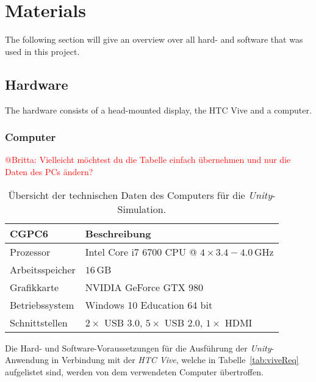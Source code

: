 \section{Materials}\label{sec:Materials}

The following section will give an overview over all hard- and software that was used in this project. 

\subsection{Hardware}\label{sec:Hardware}

The hardware consists of a head-mounted display, the HTC Vive and a computer. 

\subsubsection{Computer}\label{sec:Computer}
\textcolor{red}{@Britta: Vielleicht möchtest du die Tabelle einfach übernehmen und nur die Daten des PCs ändern?}\\

\begin{table}
	\centering
	\begin{tabular}{|l|l|}
		\hline
		\Absatzbox{}
		\textbf{CGPC6}& \textbf{Beschreibung} \\
		\hline
		Prozessor & Intel Core i7 6700 CPU @ $4\times3.4-4.0\,$GHz \\
		\hline
		Arbeitsspeicher & $16\,$GB \\
 		\hline 
		Grafikkarte & NVIDIA GeForce GTX 980\\
		\hline
		Betriebssystem & Windows 10 Education 64 bit \\
		\hline
		Schnittstellen & $2\times$ USB 3.0, $5\times$ USB 2.0, $1\times $ HDMI\\
		\hline
	\end{tabular}
	\caption[Übersicht technische Daten des Computers für \emph{Unity}-Simulation]{Übersicht der technischen Daten des Computers für die \emph{Unity}-Simulation.}
	\label{tab:Computer}
\end{table}

Die Hard- und Software-Voraussetzungen für die Ausführung der \textit{Unity}-Anwendung in Verbindung mit der \textit{HTC Vive}, welche in Tabelle~\ref{tab:viveReq} aufgelistet sind, werden von dem verwendeten Computer übertroffen.

